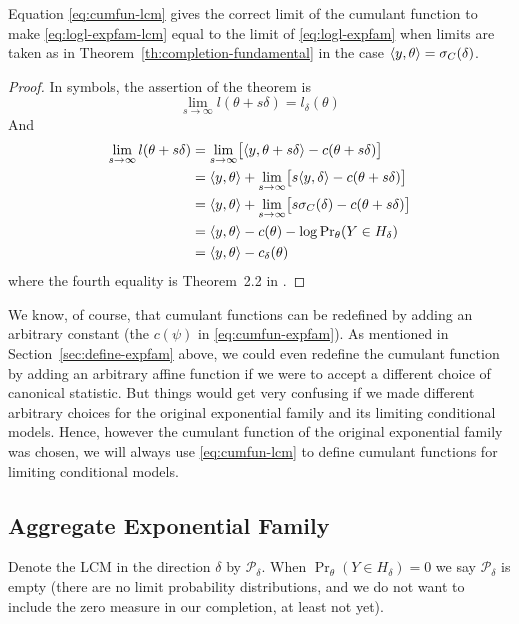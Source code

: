 \begin{theorem} \label{th:cumfun-lcm}
Equation \eqref{eq:cumfun-lcm} gives the correct limit of the cumulant function
to make \eqref{eq:logl-expfam-lcm} equal to the limit of \eqref{eq:logl-expfam}
when limits are taken as in Theorem~\ref{th:completion-fundamental}
in the case $\langle y, \theta \rangle = \sigma_C(\delta)$.
\end{theorem}
\begin{proof}
In symbols, the assertion of the theorem is
$$
   \lim_{s \to \infty} l(\theta + s \delta)
   =
   l_\delta(\theta)
$$
And
\begin{align*}
   \lim_{s \to \infty} l(\theta + s \delta)
   & =
   \lim_{s \to \infty}
   \bigl[ \langle y, \theta + s \delta \rangle - c(\theta + s \delta) \bigr]
   \\
   & =
   \langle y, \theta \rangle + \lim_{s \to \infty}
   \bigl[ s \langle y, \delta \rangle - c(\theta + s \delta) \bigr]
   \\
   & =
   \langle y, \theta \rangle + \lim_{s \to \infty}
   \bigl[ s \sigma_C(\delta) - c(\theta + s \delta) \bigr]
   \\
   & =
   \langle y, \theta \rangle - c(\theta) - \log \Pr\nolimits_\theta(Y \in H_\delta)
   \\
   & =
   \langle y, \theta \rangle - c_\delta(\theta)
\end{align*}
where the fourth equality is Theorem~{2.2} in \citet{geyer-thesis}.
\end{proof}

We know, of course, that cumulant functions can be redefined by adding an
arbitrary constant (the $c(\psi)$ in \eqref{eq:cumfun-expfam}).
As mentioned in Section~\ref{sec:define-expfam} above, we could even redefine
the cumulant function by adding an arbitrary affine function if we were to
accept a different choice of canonical statistic.  But things would get
very confusing if we made different arbitrary choices for the original
exponential family and its limiting conditional models.  Hence, however
the cumulant function of the original exponential family was chosen, we
will always use \eqref{eq:cumfun-lcm} to define cumulant functions
for limiting conditional models.

\subsection{Aggregate Exponential Family}

Denote the LCM in the direction $\delta$ by $\mathcal{P}_\delta$.
When $\Pr_\theta(Y \in H_\delta) = 0$ we say $\mathcal{P}_\delta$ is empty
(there are no limit probability distributions, and we do not want to include
the zero measure in our completion, at least not yet).

